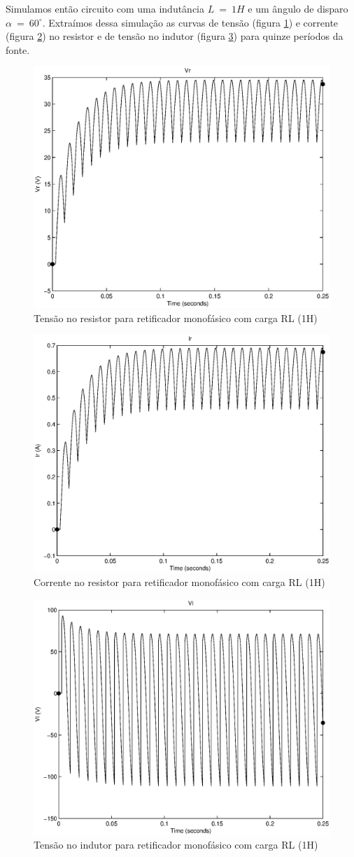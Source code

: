 \documentclass{report}
\begin{document}
Simulamos então circuito com uma indutância $L\ =\ 1H$ e um ângulo de disparo $\alpha\ =\ 60^\circ$. Extraímos dessa simulação as curvas de tensão (figura \ref{fig:rl2vr}) e corrente (figura \ref{fig:rl2ir}) no resistor e de tensão no indutor (figura \ref{fig:rl2vl}) para quinze períodos da fonte.
\begin{figure}[H]
	\centering
	\includegraphics[width=0.7\linewidth]{matlab/rl2_vr}
	\caption{Tensão no resistor para retificador monofásico com carga RL (1H)}
	\label{fig:rl2vr}
\end{figure}
\begin{figure}[H]
	\centering
	\includegraphics[width=0.7\linewidth]{matlab/rl2_ir}
	\caption{Corrente no resistor para retificador monofásico com carga RL (1H)}
	\label{fig:rl2ir}
\end{figure}
\begin{figure}[H]
	\centering
	\includegraphics[width=0.7\linewidth]{matlab/rl2_vl}
	\caption{Tensão no indutor para retificador monofásico com carga RL (1H)}
	\label{fig:rl2vl}
\end{figure}
\end{document}
